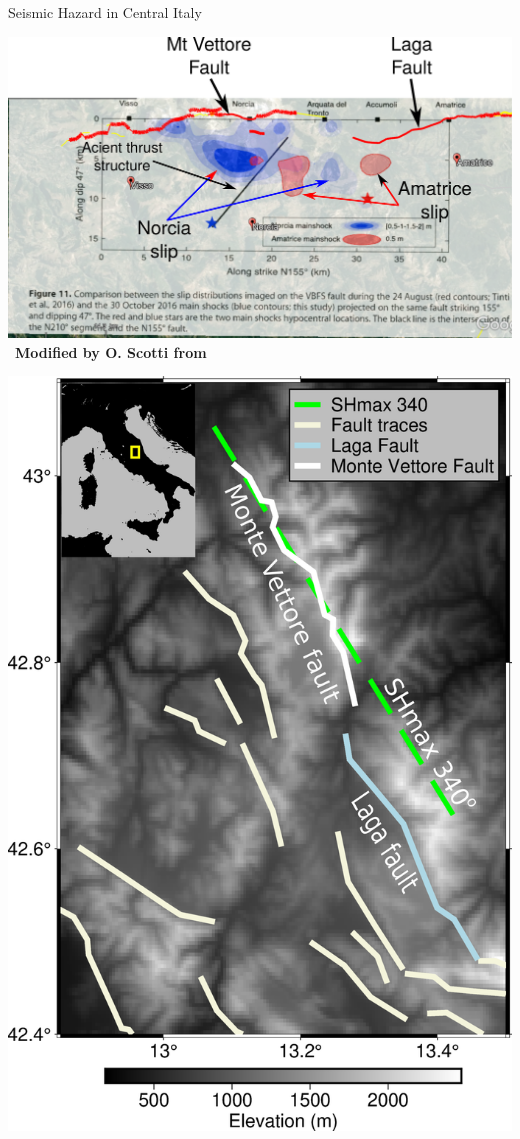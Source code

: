 \documentclass{beamer}
\begin{document}
\begin{frame}
 {Seismic Hazard in Central Italy}
 
 \begin{center}
  \begin{center}
 \begin{minipage}{0.65\linewidth}
  \includegraphics[width=1\linewidth]{images/amatrice_4.pdf} \,
  \vskip 0.2cm
  {\bf \tiny Modified by O. Scotti from \cite{Scognamiglio_2018_CFG}} \end{minipage}
 \begin{minipage}{0.33\linewidth}
  \includegraphics[width=1\linewidth]{images/Map_Italy.png}  

\end{minipage}
\end{center}
\end{center}
\end{frame}
\end{document}
